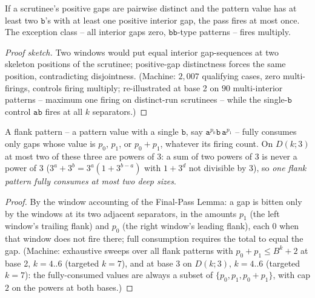 \begin{lemma}
    \label{dich:lem:SD}
    If a scrutinee's positive gaps are pairwise distinct and the
    pattern value has at least two $\mathtt b$'s with at least one
    positive interior gap, the pass fires at most once.  The exception
    class -- all interior gaps zero, $\mathtt{bb}$-type patterns --
    fires multiply.
\end{lemma}

\begin{proof}[Proof sketch]
    Two windows would put equal interior gap-sequences at two skeleton
    positions of the scrutinee; positive-gap distinctness forces the
    same position, contradicting disjointness.  (Machine: $2{,}007$
    qualifying cases, zero multi-firings, controls firing multiply;
    re-illustrated at base 2 on $90$ multi-interior patterns -- maximum
    one firing on distinct-run scrutinees -- while the
    single-$\mathtt b$ control $\mathtt{ab}$ fires at all $k$
    separators.)
\end{proof}

\begin{lemma}
    \label{dich:lem:flankcap}
    A flank pattern -- a pattern value with a single $\mathtt b$, say
    $\mathtt a^{p_0}\mathtt b\,\mathtt a^{p_1}$ -- fully consumes only
    gaps whose value is $p_0$, $p_1$, or $p_0 + p_1$, whatever its
    firing count.  On $D(k;3)$ at most two of these three are powers
    of $3$: a sum of two powers of $3$ is never a power of $3$
    ($3^a + 3^b = 3^a(1 + 3^{b-a})$ with $1 + 3^d$ not divisible by
    $3$), so \emph{one flank pattern fully consumes at most two deep
    sizes}.
\end{lemma}

\begin{proof}
    By the window accounting of the Final-Pass Lemma: a gap is bitten
    only by the windows at its two adjacent separators, in the amounts
    $p_1$ (the left window's trailing flank) and $p_0$ (the right
    window's leading flank), each $0$ when that window does not fire
    there; full consumption requires the total to equal the gap.
    (Machine: exhaustive sweeps over all flank patterns with
    $p_0 + p_1 \le B^k + 2$ at base 2, $k = 4..6$ (targeted $k = 7$),
    and at base 3 on $D(k;3)$, $k = 4..6$ (targeted $k = 7$): the
    fully-consumed values are always a subset of
    $\{p_0, p_1, p_0+p_1\}$, with cap $2$ on the powers at both
    bases.)
\end{proof}

